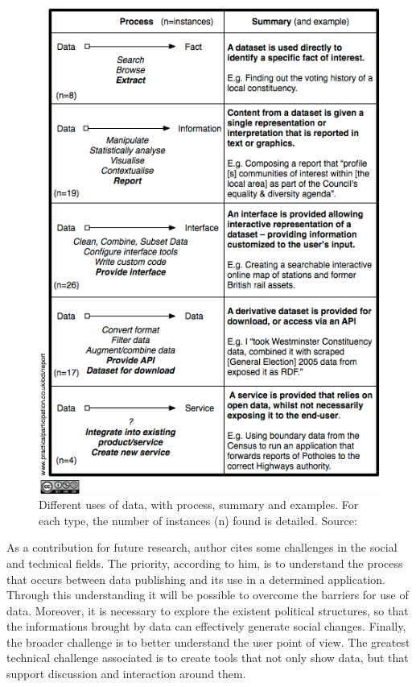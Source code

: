 \begin{figure}[h!]
\begin{center}
\includegraphics[scale=0.6]{images/Data-Schematic-FiveTypes}
\caption[Different uses of data, with process, summary and examples.]{Different uses of data, with process, summary and examples. For each type, the number of instances (n) found is detailed. Source: }
\label{fig:opendatause}
\end{center}
\end{figure}

As a contribution for future research, author cites some challenges in the social and technical fields.
The priority, according to him, is to understand the process that occurs between data publishing and its use in a determined application.
Through this understanding it will be possible to overcome the barriers for use of data.
Moreover, it is necessary to explore the existent political structures, so that the informations brought by data can effectively generate social changes.
Finally, the broader challenge is to better understand the user point of view.
The greatest technical challenge associated is to create tools that not only show data, but that support discussion and interaction around them.

